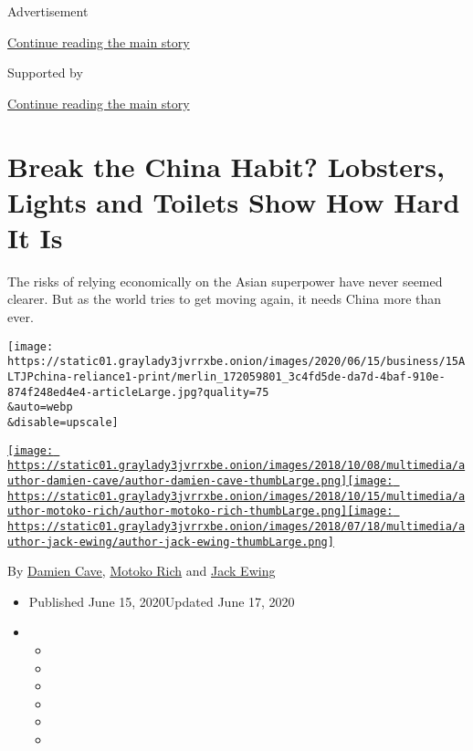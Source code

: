 Advertisement

\protect\hyperlink{after-top}{Continue reading the main story}

Supported by

\protect\hyperlink{after-sponsor}{Continue reading the main story}

\hypertarget{break-the-china-habit-lobsters-lights-and-toilets-show-how-hard-it-is}{%
\section{Break the China Habit? Lobsters, Lights and Toilets Show How
Hard It
Is}\label{break-the-china-habit-lobsters-lights-and-toilets-show-how-hard-it-is}}

The risks of relying economically on the Asian superpower have never
seemed clearer. But as the world tries to get moving again, it needs
China more than ever.

\texttt{[image: https://static01.graylady3jvrrxbe.onion/images/2020/06/15/business/15ALTJPchina-reliance1-print/merlin\_172059801\_3c4fd5de-da7d-4baf-910e-874f248ed4e4-articleLarge.jpg?quality=75\\\&auto=webp\\\&disable=upscale]}

\href{https://www.nytimes3xbfgragh.onion/by/damien-cave}{\texttt{[image: https://static01.graylady3jvrrxbe.onion/images/2018/10/08/multimedia/author-damien-cave/author-damien-cave-thumbLarge.png]}}\href{https://www.nytimes3xbfgragh.onion/by/motoko-rich}{\texttt{[image: https://static01.graylady3jvrrxbe.onion/images/2018/10/15/multimedia/author-motoko-rich/author-motoko-rich-thumbLarge.png]}}\href{https://www.nytimes3xbfgragh.onion/by/jack-ewing}{\texttt{[image: https://static01.graylady3jvrrxbe.onion/images/2018/07/18/multimedia/author-jack-ewing/author-jack-ewing-thumbLarge.png]}}

By \href{https://www.nytimes3xbfgragh.onion/by/damien-cave}{Damien
Cave}, \href{https://www.nytimes3xbfgragh.onion/by/motoko-rich}{Motoko
Rich} and \href{https://www.nytimes3xbfgragh.onion/by/jack-ewing}{Jack
Ewing}

\begin{itemize}
\item
  Published June 15, 2020Updated June 17, 2020
\item
  \begin{itemize}
  \item
  \item
  \item
  \item
  \item
  \item
  \end{itemize}
\end{itemize}

